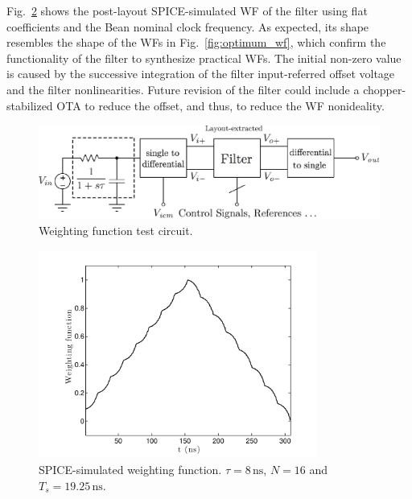 Fig.~\ref{fig:sim_wf} shows the post-layout SPICE-simulated WF of the filter using flat coefficients and the Bean nominal clock frequency. As expected, its shape resembles the shape of the WFs in Fig.~\ref{fig:optimum_wf},  which confirm the functionality of the filter to synthesize practical WFs. The initial non-zero value is caused by the successive integration of the filter input-referred offset voltage and the filter nonlinearities. Future revision of the filter could include a chopper-stabilized OTA to reduce the offset, and thus, to reduce the WF nonideality.

\begin{figure}[!t]
	\centering
	\includegraphics[width=5in]{./Test/wf_test_circuit}
	\caption{Weighting function test circuit.}\label{fig:wf_test_circuit}
\end{figure}

\begin{figure}[!t]
	\centering
	\includegraphics[width=3.6in]{./Test/sim_wf}
	\caption{SPICE-simulated weighting function. $\tau=8\,\text{ns}$, $N=16$ and $T_s=19.25\,\text{ns}$.}\label{fig:sim_wf}
\end{figure}








